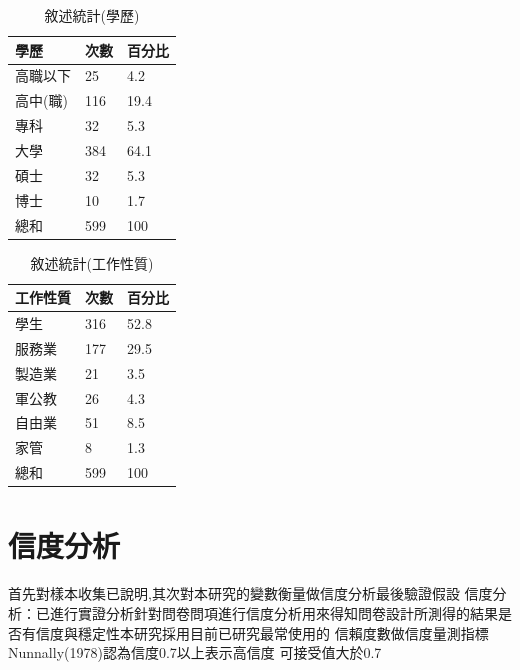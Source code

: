 \begin{table}[htb]
\caption{敘述統計(學歷)}
\label{tab:PL3}
\renewcommand{\arraystretch}{1.2} %
\arrayrulewidth=1pt               %
\tabcolsep=60pt                   %
%
\begin{tabular}[t]{lll}  %
\hline
 學歷& 次數 & 百分比 \\
\hline
高職以下       & 25  & 4.2 \\
高中(職)        & 116  &19.4\\
專科        & 32  & 5.3 \\
大學        & 384 &64.1\\
碩士        & 32  & 5.3 \\
博士           & 10  & 1.7 \\
總和           & 599  & 100 \\
\hline
\end{tabular}
\end{table}

\begin{table}[htb]
\caption{敘述統計(工作性質)}
\label{tab:PL4}
\renewcommand{\arraystretch}{1.2} %
\arrayrulewidth=1pt               %
\tabcolsep=60pt                   %
\begin{tabular}[t]{lll}  %
\hline
 工作性質& 次數 & 百分比 \\
\hline
學生           & 316  & 52.8 \\
服務業        & 177  & 29.5 \\
製造業        & 21  & 3.5 \\
軍公教        & 26  &4.3\\
自由業        & 51  & 8.5 \\
家管           & 8  & 1.3 \\
總和               & 599  & 100 \\
\hline
\end{tabular}
\end{table}

\section{信度分析}
首先對樣本收集已說明,其次對本研究的變數衡量做信度分析最後驗證假設
信度分析：已進行實證分析針對問卷問項進行信度分析用來得知問卷設計所測得的結果是否有信度與穩定性本研究採用目前已研究最常使用的 信賴度數做信度量測指標 Nunnally(1978)認為信度0.7以上表示高信度 可接受值大於0.7

